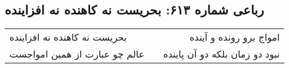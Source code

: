 \begin{center}
\section*{رباعی شماره ۶۱۳: بحریست نه کاهنده نه افزاینده}
\label{sec:sh613}
\begin{longtable}{l p{0.5cm} r}
بحریست نه کاهنده نه افزاینده
&&
امواج برو رونده و آینده
\\
عالم چو عبارت از همین امواجست
&&
نبود دو زمان بلکه دو آن پاینده
\\
\end{longtable}
\end{center}
